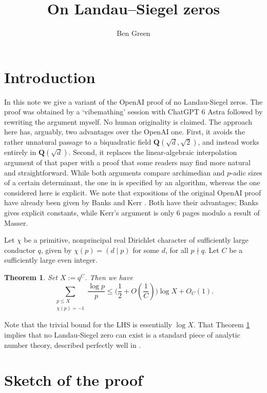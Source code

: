 \documentclass[11pt,reqno]{amsart}
\title{On Landau--Siegel zeros}
\author{Ben Green}
\numberwithin{equation}{section}
\newtheorem{theorem}{Theorem}[section]
\newcommand{\Q}{\mathbf{Q}}
\renewcommand{\le}{\leqslant}
\begin{document}
\maketitle

\section{Introduction}

In this note we give a variant of the OpenAI proof \cite{openai-no-siegel} of no Landau-Siegel zeros. The proof was obtained by a `vibemathing' session with ChatGPT 6 Astra followed by rewriting the argument myself. No human originality is claimed. The approach here has, arguably, two advantages over the OpenAI one. First, it avoids the rather unnatural passage to a biquadratic field $\Q(\sqrt{d}, \sqrt{2})$, and instead works entirely in $\Q(\sqrt{d})$. Second, it replaces the linear-algebraic interpolation argument of that paper with a proof that some readers may find more natural and straightforward. While both arguments compare archimedian and $p$-adic sizes of a certain determinant, the one in \cite{openai-no-siegel} is specified by an algorithm, whereas the one considered here is explicit. We note that expositions of the original OpenAI proof have already been given by Banks \cite{banks} and Kerr \cite{kerr}. Both have their advantages; Banks gives explicit constants, while Kerr's argument is only 6 pages modulo a result of Masser.

Let $\chi$ be a primitive, nonprincipal real Dirichlet character of sufficiently large conductor $q$, given by $\chi(p) = (d \mid p)$ for some $d$, for all $p \nmid q$. Let $C$ be a sufficiently large even integer.
\begin{theorem}\label{mainthm}   Set $X := q^{C}$. Then we have
\[ \sum_{\substack{p \le X \\ \chi(p) = -1}} \frac{\log p}{p} \le \big(\frac{1}{2} + O(\frac{1}{C})\big)\log X + O_C(1).\] 
\end{theorem}
Note that the trivial bound for the LHS is essentially $\log X$. That Theorem \ref{mainthm} implies that no Landau-Siegel zero can exist is a standard piece of analytic number theory, described perfectly well in \cite{openai-no-siegel}.



\section{Sketch of the proof}
\end{document}
